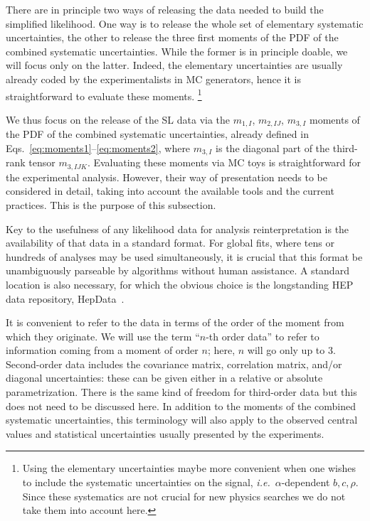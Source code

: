 \documentclass[11pt]{article}
\def\ie{{\it i.e.}}
\begin{document}
There are in principle two ways of releasing the data needed to build the simplified likelihood. One way %
is to release the whole set of elementary systematic uncertainties, the other to release the three first moments of the PDF of the combined systematic uncertainties. While the former is in principle doable, we will focus only on the latter. Indeed, the elementary uncertainties are usually already  coded by the experimentalists in MC generators, hence it is straightforward to evaluate these moments.%
\footnote{Using the elementary uncertainties maybe more convenient when one wishes to include the systematic uncertainties on the signal, \ie\  $\alpha$-dependent $b,c,\rho$. Since these systematics are not crucial for new physics searches we do not take them into account here.}




We thus focus on the release of the  SL data via the  $m_{1,I}$, $m_{2,IJ}$, $m_{3,I}$
moments   of the PDF of the combined systematic uncertainties,  already defined in Eqs.~\eqref{eq:moments1}--\eqref{eq:moments2}, where $m_{3,I}$ is the diagonal part of the third-rank tensor $m_{3,IJK}$.  Evaluating these moments via MC toys is straightforward for the experimental analysis. However, their way of presentation needs to be %
considered in detail, taking into account  the available tools and the current practices. This is the purpose of this subsection.



Key to the usefulness of any likelihood data for analysis reinterpretation is
the availability of that data in a standard format. For global fits, where tens
or hundreds of analyses may be used simultaneously, it is crucial that this
format be unambiguously parseable by algorithms without human assistance. A
standard location is also necessary, for which the obvious choice is the longstanding
HEP data repository, HepData~\cite{hepdata}.





It is convenient to refer to the data in terms of
the order of the moment from which they originate. We will use the term ``$n$-th
order data'' to refer to information coming from a moment of order $n$; here, $n$
will go only up to $3$. Second-order data includes the covariance matrix,
correlation matrix, and/or diagonal uncertainties: these can be given either in a
relative or absolute parametrization. There is the same kind of freedom for
third-order data but this does not need to be discussed here. In addition to the
moments of the combined systematic uncertainties, this terminology will also
apply to the observed central values and statistical uncertainties usually
presented by the experiments.
\end{document}
